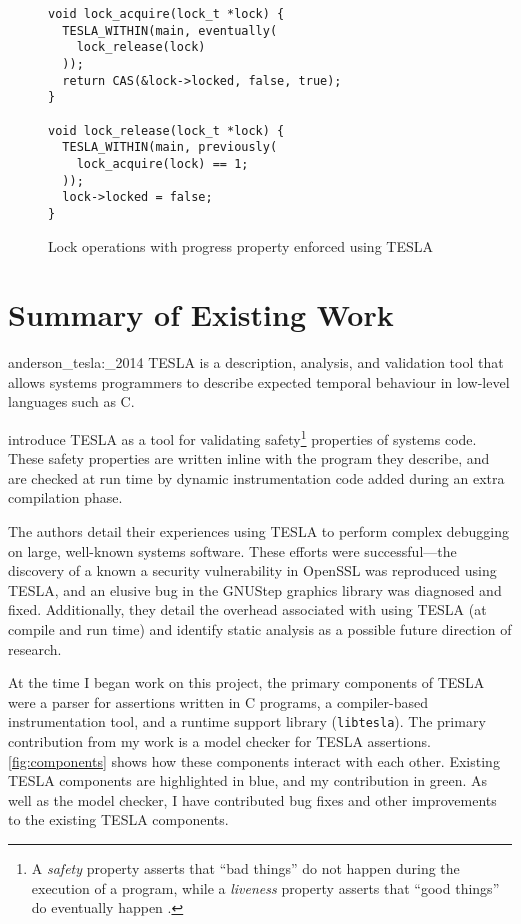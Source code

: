 \begin{figure}
  \begin{verbatim}
void lock_acquire(lock_t *lock) {
  TESLA_WITHIN(main, eventually(
    lock_release(lock)
  ));
  return CAS(&lock->locked, false, true);
}

void lock_release(lock_t *lock) {
  TESLA_WITHIN(main, previously(
    lock_acquire(lock) == 1;
  ));
  lock->locked = false;
}
  \end{verbatim}
  \caption{Lock operations with progress property enforced using TESLA}
  \label{lst:mutex-better}
\end{figure}

\section{Summary of Existing Work}

\begin{displaycquote}[p. 1]{anderson_tesla:_2014}
TESLA is a description, analysis, and validation tool that allows systems
  programmers to describe expected temporal behaviour in low-level languages
  such as C.
\end{displaycquote}

\textcite{anderson_tesla:_2014} introduce TESLA as a tool for validating
safety\footnote{A \emph{safety} property asserts that ``bad things'' do not
happen during the execution of a program, while a \emph{liveness} property
asserts that ``good things'' do eventually happen
\cite{lamport_proving_1977,alpern_defining_1984}.} properties of systems code.
These safety properties are written inline with the program they describe, and
are checked at run time by dynamic instrumentation code added during an extra
compilation phase.

The authors detail their experiences using TESLA to perform complex debugging on
large, well-known systems software. These efforts were successful---the
discovery of a known a security vulnerability in OpenSSL was reproduced using
TESLA, and an elusive bug in the GNUStep graphics library was diagnosed and
fixed. Additionally, they detail the overhead associated with using TESLA (at
compile and run time) and identify static analysis as a possible future
direction of research.

At the time I began work on this project, the primary components of TESLA were a
parser for assertions written in C programs, a compiler-based instrumentation
tool, and a runtime support library (\texttt{libtesla}). The primary
contribution from my work is a model checker for TESLA assertions.
\autoref{fig:components} shows how these components interact with each other.
Existing TESLA components are highlighted in blue, and my contribution in green.
As well as the model checker, I have contributed bug fixes and other
improvements to the existing TESLA components. 

